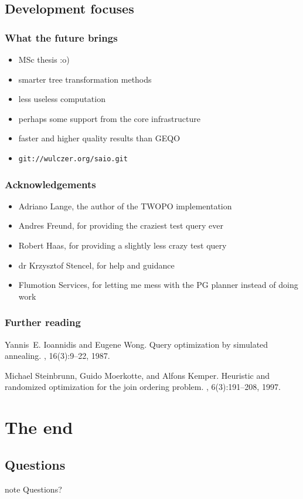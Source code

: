 \documentclass{beamer}
\begin{document}
\subsection{Development focuses}

\begin{frame}
  \frametitle{What the future brings}

  \begin{itemize}
  \item MSc thesis :o)
  \item smarter tree transformation methods
  \item less useless computation
  \item perhaps some support from the core infrastructure
  \item faster and higher quality results than GEQO
  \item \texttt{git://wulczer.org/saio.git}
  \end{itemize}
\end{frame}

\begin{frame}
  \frametitle{Acknowledgements}

  \begin{itemize}
  \item Adriano Lange, the author of the TWOPO implementation
  \item Andres Freund, for providing the craziest test query ever
  \item Robert Haas, for providing a slightly less crazy test query
  \item dr Krzysztof Stencel, for help and guidance
  \item Flumotion Services, for letting me mess with the PG planner instead of
    doing work
  \end{itemize}
\end{frame}

\begin{frame}
  \frametitle{Further reading}

  \begin{thebibliography}{Steinbrunn 1997}

    Yannis~E. Ioannidis and Eugene Wong.
    \newblock Query optimization by simulated annealing.
    , 16(3):9--22, 1987.

    Michael Steinbrunn, Guido Moerkotte, and Alfons Kemper.
    \newblock Heuristic and randomized optimization for the join ordering problem.
    , 6(3):191--208, 1997.

  \end{thebibliography}
\end{frame}

\section{The end}
\subsection*{Questions}

\begin{frame}
\begin{beamercolorbox}[center]{note}
  \Huge Questions?
\end{beamercolorbox}
\end{frame}

\appendix

\end{document}
